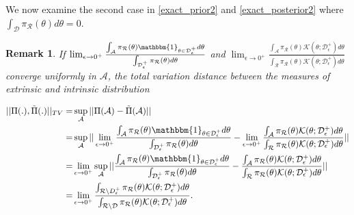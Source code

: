 \documentclass[10pt]{article}
\newtheorem{remark}{Remark}
\newcommand{\mc}[1]{\mathcal{#1}}
\DeclareMathOperator{\1}{\mathbbm{1}}
\begin{document}
We now examine the second case in \eqref{exact_prior2} and \eqref{exact_posterior2} where ${ \int_{\mc D} \pi_{\mc R}(\theta)d\theta }=0$.


\begin{remark}
If $\lim_{\epsilon\rightarrow 0^+} \frac{\int_{\mc A} \pi_{\mc R}(\theta) \mathbbm{1}_{\theta\in \mc D_\epsilon^+} d\theta}{ \int_{\mc D_\epsilon^+} \pi_{\mc R}(\theta)d\theta }$ and $ \lim_{\epsilon\rightarrow 0^+}\frac{\int_{\mc A} \pi_{\mc R}(\theta) \mc K({\theta; \mc D_\epsilon^+}) d\theta}{ \int_{\mc R} \pi_{\mc R}(\theta)  \mc K({\theta; \mc D_\epsilon^+}) d\theta }  $ converge uniformly in $\mc A$, the total variation distance between the measures of extrinsic and intrinsic distribution

\begin{equation}
	\begin{aligned}
	||\Pi(.), \tilde{\Pi}(.) ||_{TV}
	= &\sup_{\mc A} ||\Pi(\mc A)- \tilde{\Pi}(\mc A)||\\
	= & \sup_{\mc A}|| \lim_{\epsilon\rightarrow 0^+} \frac{\int_{\mc A} \pi_{\mc R}(\theta) \mathbbm{1}_{\theta\in \mc D_\epsilon^+} d\theta}{ \int_{\mc D_\epsilon^+} \pi_{\mc R}(\theta)d\theta }-  \lim_{\epsilon\rightarrow 0^+}\frac{\int_{\mc A} \pi_{\mc R}(\theta) \mc K({\theta; \mc D_\epsilon^+}) d\theta}{ \int_{\mc R} \pi_{\mc R}(\theta)  \mc K({\theta; \mc D_\epsilon^+}) d\theta } || \\
	= & \lim_{\epsilon\rightarrow 0^+} \sup_{\mc A}|| \frac{\int_{\mc A} \pi_{\mc R}(\theta) \mathbbm{1}_{\theta\in \mc D_\epsilon^+} d\theta}{ \int_{\mc D_\epsilon^+} \pi_{\mc R}(\theta)d\theta }-  \frac{\int_{\mc A} \pi_{\mc R}(\theta) \mc K({\theta; \mc D_\epsilon^+}) d\theta}{ \int_{\mc R} \pi_{\mc R}(\theta)  \mc K({\theta; \mc D_\epsilon^+}) d\theta } || \\
	=& \lim_{\epsilon\rightarrow 0^+}  \frac{\int_{\mc R \setminus \mc \mc D^+_\epsilon} \pi_{\mc R}(\theta) \mc K(\theta;\mc D^+_\epsilon)d\theta}{\int_{\mc R \setminus \mc D} \pi_{\mc R}(\theta) \mc K(\theta;\mc D^+_\epsilon)d\theta}.
	\end{aligned}
\end{equation}
\end{remark}
\end{document}
